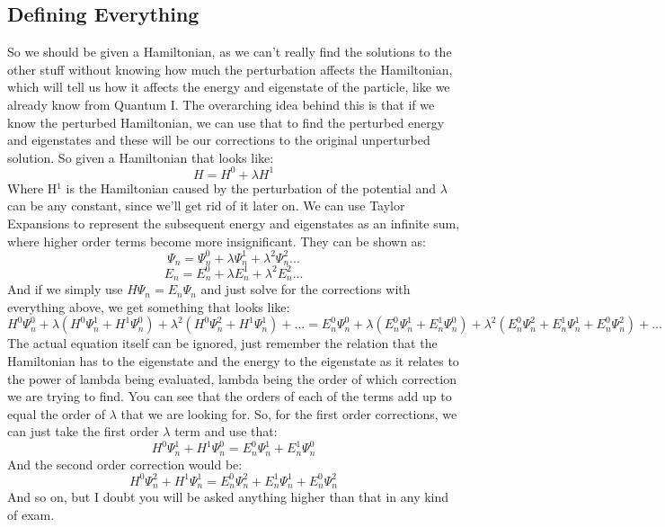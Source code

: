 \documentclass[garamond]{article}
\begin{document}
\subsection{Defining Everything}
So we should be given a Hamiltonian, as we can't really find the solutions to the other stuff without knowing how much the perturbation affects the Hamiltonian, which will tell us how it affects the energy and eigenstate of the particle, like we already know from Quantum I. The overarching idea behind this is that if we know the perturbed Hamiltonian, we can use that to find the perturbed energy and eigenstates and these will be our corrections to the original unperturbed solution. So given a Hamiltonian that looks like:
\begin{equation}
H=H^0+\lambda H^1
\end{equation}
Where H$^1$ is the Hamiltonian caused by the perturbation of the potential and $\lambda$ can be any constant, since we'll get rid of it later on. We can use Taylor Expansions to represent the subsequent energy and eigenstates as an infinite sum, where higher order terms become more insignificant. They can be shown as:
\begin{equation}
\Psi_n=\Psi_n^0+\lambda\Psi_n^1+\lambda^2\Psi_n^2...
\end{equation}
\begin{equation}
E_n=E_n^0+\lambda E_n^1+\lambda^2E_n^2...
\end{equation}
And if we simply use $H\Psi_n=E_n\Psi_n$ and just solve for the corrections with everything above, we get something that looks like:
\begin{equation*}
H^0\Psi^0_n+\lambda(H^0\Psi^1_n+H^1\Psi^0_n)+\lambda^2(H^0\Psi^2_n+H^1\Psi^1_n)+... = E_n^0\Psi^0_n+\lambda(E^0_n\Psi^1_n+E^1_n\Psi^0_n)+\lambda^2(E^0_n\Psi^2_n+E^1_n\Psi^1_n+E^0_n\Psi^2_n)+...
\end{equation*}
The actual equation itself can be ignored, just remember the relation that the Hamiltonian has to the eigenstate and the energy to the eigenstate as it relates to the power of lambda being evaluated, lambda being the order of which correction we are trying to find. You can see that the orders of each of the terms add up to equal the order of $\lambda$ that we are looking for. So, for the first order corrections, we can just take the first order $\lambda$ term and use that:
\begin{equation}
H^0\Psi^1_n+H^1\Psi^0_n=E^0_n\Psi^1_n+E^1_n\Psi^0_n
\end{equation}
And the second order correction would be:
\begin{equation}
H^0\Psi^2_n+H^1\Psi^1_n=E^0_n\Psi^2_n+E^1_n\Psi^1_n+E^0_n\Psi^2_n
\end{equation}
And so on, but I doubt you will be asked anything higher than that in any kind of exam.
\end{document}
